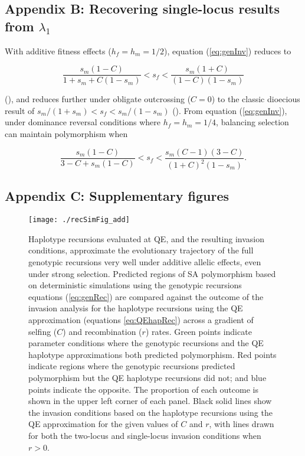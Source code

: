 \documentclass{article}
\begin{document}
\subsection*{Appendix B: Recovering single-locus results from $\lambda_1$}
\renewcommand{\theequation}{B\arabic{equation}}
\setcounter{equation}{0}
\renewcommand{\thefigure}{B\arabic{figure}}
\setcounter{figure}{0}


With additive fitness effects ($h_f = h_m = 1/2$), equation (\ref{eq:genInv}) reduces to 

\begin{equation} \label{eq:addInv}
	\frac{s_m (1 - C)}{1 + s_m + C(1 - s_m)} < s_f < \frac{s_m(1 + C)}{(1 - C)(1 - s_m)}
\end{equation}

\noindent{} (\citealt{JordanConn2014}), and reduces further under obligate outcrossing ($C = 0$) to the classic dioecious result of $s_m/(1 + s_m) < s_f < s_m/(1 - s_m)$ (\citealt{Kidwell1977}). From equation (\ref{eq:genInv}), under dominance reversal conditions where $h_f = h_m = 1/4$, balancing selection can maintain polymorphism when

\begin{equation} \label{eq:domRevInv}
	\frac{s_m (1 - C)}{3 - C + s_m(1 - C)} < s_f < \frac{s_m(C - 1)(3 - C)}{(1 + C)^2 (1 - s_m)}.
\end{equation}






\subsection*{Appendix C: Supplementary figures}
\renewcommand{\thefigure}{C\arabic{figure}}
\setcounter{figure}{0}
\newpage{}

\begin{figure}[H]
\texttt{[image: ./recSimFig\_add]}
\caption{Haplotype recursions evaluated at QE, and the resulting invasion conditions, approximate the evolutionary trajectory of the full genotypic recursions very well under additive allelic effects, even under strong selection. Predicted regions of SA polymorphism based on deterministic simulations using the genotypic recursions equations (\ref{eq:genRec}) are compared against the outcome of the invasion analysis for the haplotype recursions using the QE approximation (equations \ref{eq:QEhapRec}) across a gradient of selfing ($C$) and recombination ($r$) rates. Green points indicate parameter conditions where the genotypic recursions and the QE haplotype approximations both predicted polymorphism. Red points indicate regions where the genotypic recursions predicted polymorphism but the QE haplotype recursions did not; and blue points indicate the opposite. The proportion of each outcome is shown in the upper left corner of each panel. Black solid lines show the invasion conditions based on the haplotype recursions using the QE approximation for the given values of $C$ and $r$, with lines drawn for both the two-locus and single-locus invasion conditions when $r > 0$.}
\label{fig:addSim}
\end{figure}
\newpage{}
\end{document}
